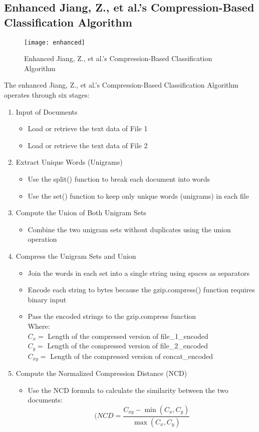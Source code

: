 \documentclass{article}
\begin{document}
\subsection{Enhanced  Jiang, Z., et al.'s Compression-Based Classification Algorithm}
\begin{figure}[H]
    \centering
    \texttt{[image: enhanced]}
    \caption{Enhanced  Jiang, Z., et al.'s Compression-Based Classification Algorithm}
    \label{fig:enhanced jiang}
\end{figure}
The enhanced Jiang, Z., et al.'s Compression-Based Classification Algorithm operates through six stages:
\begin{enumerate}
    \item Input of Documents
    \begin{itemize}
        \item Load or retrieve the text data of File 1
        \item Load or retrieve the text data of File 2
    \end{itemize}
    \item Extract Unique Words (Unigrams)
    \begin{itemize}
        \item Use the split() function to break each document into words
        \item Use the set() function to keep only unique words (unigrams) in each file
    \end{itemize}
    \item Compute the Union of Both Unigram Sets
    \begin{itemize}
        \item Combine the two unigram sets without duplicates using the union operation
    \end{itemize}
    \item Compress the Unigram Sets and Union
    \begin{itemize}
        \item Join the words in each set into a single string using spaces as separators
        \item Encode each string to bytes because the gzip.compress() function requires binary input
        \item Pass the encoded strings to the gzip.compress function \\
            Where: \\
                \(C_x = \) Length of the compressed version of file\_1\_encoded \\ 
                \(C_y = \) Length of the compressed version of file\_2\_encoded \\ 
                \(C_{xy} = \) Length of the compressed version of concat\_encoded
    \end{itemize}
    \item Compute the Normalized Compression Distance (NCD)
    \begin{itemize}
        \item Use the NCD formula to calculate the similarity between the two documents: 
           \[(NCD = \frac{C_{xy} - \min(C_x, C_y)}{\max(C_x, C_y)} \]
           

\end{itemize}
\end{enumerate}
\end{document}
